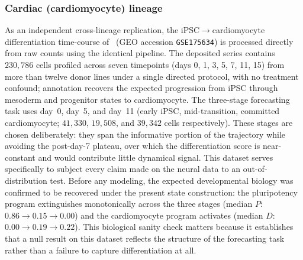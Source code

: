 \documentclass[10pt,letterpaper]{article}
\begin{document}
\subsubsection*{Cardiac (cardiomyocyte) lineage}
As an independent cross-lineage replication, the iPSC$\rightarrow$cardiomyocyte differentiation time-course of~\cite{elorbany2022single} (GEO accession \texttt{GSE175634}) is processed directly from raw counts using the identical pipeline. The deposited series contains $230{,}786$ cells profiled across seven timepoints (days 0, 1, 3, 5, 7, 11, 15) from more than twelve donor lines under a single directed protocol, with no treatment confound; annotation recovers the expected progression from iPSC through mesoderm and progenitor states to cardiomyocyte. The three-stage forecasting task uses day~0, day~5, and day~11 (early iPSC, mid-transition, committed cardiomyocyte; $41{,}330$, $19{,}508$, and $39{,}342$ cells respectively). These stages are chosen deliberately: they span the informative portion of the trajectory while avoiding the post-day-7 plateau, over which the differentiation score is near-constant and would contribute little dynamical signal. This dataset serves specifically to subject every claim made on the neural data to an out-of-distribution test. Before any modeling, the expected developmental biology was confirmed to be recovered under the present state construction: the pluripotency program extinguishes monotonically across the three stages (median $P$: $0.86\!\rightarrow\!0.15\!\rightarrow\!0.00$) and the cardiomyocyte program activates (median $D$: $0.00\!\rightarrow\!0.19\!\rightarrow\!0.22$). This biological sanity check matters because it establishes that a null result on this dataset reflects the structure of the forecasting task rather than a failure to capture differentiation at all.
\end{document}

